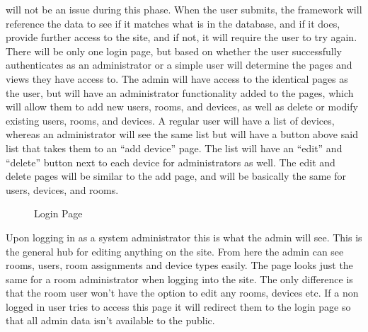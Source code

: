 \documentclass{report}
\begin{document}
will not be an issue during this phase. When the user submits, the framework will reference the data to see if it matches what is in the database, and if it does, provide further access to the site, and if not, it will require the user to try again. 
\newline
\indent
There will be only one login page, but based on whether the user successfully authenticates as an administrator or a simple user will determine the pages and views they have access to. 
The admin will have access to the identical pages as the user, but will have an administrator functionality added to the pages, which will allow them to add new users, rooms, and devices, as well as delete or modify existing users, rooms, and devices. 
A regular user will have a list of devices, whereas an administrator will see the same list but will have a button above said list that takes them to an “add device” page.  
The list will have an “edit” and “delete” button next to each device for administrators as well. The edit and delete pages will be similar to the add page, and will be basically the same for users, devices, and rooms. 
\begin{figure}[H]
\caption{Login Page}
\end{figure}
\newpage

Upon logging in as a system administrator this is what the admin will see.
This is the general hub for editing anything on the site.
From here the admin can see rooms, users, room assignments and device types easily.
The page looks just the same for a room administrator when logging into the site. 
The only difference is that the room user won't have the option to edit any rooms, devices etc.
If a non logged in user tries to access this page it will redirect them to the login page so that all admin data isn't available to the public.
\end{document}
